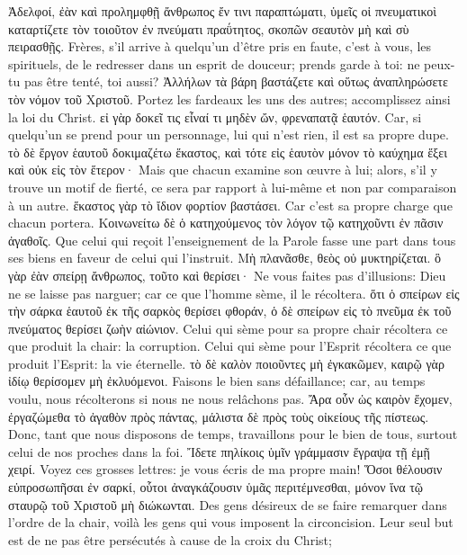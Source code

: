 \documentclass[14pt,a4paper,twoside]{extarticle}
\begin{document}
\begin{paracol}[1]
  \verset
  {Ἀδελφοί, ἐὰν καὶ προλημφθῇ ἄνθρωπος ἔν τινι παραπτώματι, ὑμεῖς οἱ πνευματικοὶ καταρτίζετε τὸν τοιοῦτον ἐν πνεύματι πραΰτητος, σκοπῶν σεαυτὸν μὴ καὶ σὺ πειρασθῇς.}
  {Frères, s’il arrive à quelqu’un d’être pris en faute, c’est à vous, les spirituels, de le redresser dans un esprit de douceur; prends garde à toi: ne peux-tu pas être tenté, toi aussi?}
  \verset
  {Ἀλλήλων τὰ βάρη βαστάζετε καὶ οὕτως ἀναπληρώσετε τὸν νόμον τοῦ Χριστοῦ.}
  {Portez les fardeaux les uns des autres; accomplissez ainsi la loi du Christ.}
  \verset
  {εἰ γὰρ δοκεῖ τις εἶναί τι μηδὲν ὤν, φρεναπατᾷ ἑαυτόν.}
  {Car, si quelqu’un se prend pour un personnage, lui qui n’est rien, il est sa propre dupe.}
  \verset
  {τὸ δὲ ἔργον ἑαυτοῦ δοκιμαζέτω ἕκαστος, καὶ τότε εἰς ἑαυτὸν μόνον τὸ καύχημα ἕξει καὶ οὐκ εἰς τὸν ἕτερον·}
  {Mais que chacun examine son œuvre à lui; alors, s’il y trouve un motif de fierté, ce sera par rapport à lui-même et non par comparaison à un autre.}
  \verset
  {ἕκαστος γὰρ τὸ ἴδιον φορτίον βαστάσει.}
  {Car c’est sa propre charge que chacun portera.}
  \verset
  {Κοινωνείτω δὲ ὁ κατηχούμενος τὸν λόγον τῷ κατηχοῦντι ἐν πᾶσιν ἀγαθοῖς.}
  {Que celui qui reçoit l’enseignement de la Parole fasse une part dans tous ses biens en faveur de celui qui l’instruit.}
  \verset
  {Μὴ πλανᾶσθε, θεὸς οὐ μυκτηρίζεται. ὃ γὰρ ἐὰν σπείρῃ ἄνθρωπος, τοῦτο καὶ θερίσει·}
  {Ne vous faites pas d’illusions: Dieu ne se laisse pas narguer; car ce que l’homme sème, il le récoltera.}
  \verset
  {ὅτι ὁ σπείρων εἰς τὴν σάρκα ἑαυτοῦ ἐκ τῆς σαρκὸς θερίσει φθοράν, ὁ δὲ σπείρων εἰς τὸ πνεῦμα ἐκ τοῦ πνεύματος θερίσει ζωὴν αἰώνιον.}
  {Celui qui sème pour sa propre chair récoltera ce que produit la chair: la corruption. Celui qui sème pour l’Esprit récoltera ce que produit l’Esprit: la vie éternelle.}
  \verset
  {τὸ δὲ καλὸν ποιοῦντες μὴ ἐγκακῶμεν, καιρῷ γὰρ ἰδίῳ θερίσομεν μὴ ἐκλυόμενοι.}
  {Faisons le bien sans défaillance; car, au temps voulu, nous récolterons si nous ne nous relâchons pas.}
  \verset
  {Ἄρα οὖν ὡς καιρὸν ἔχομεν, ἐργαζώμεθα τὸ ἀγαθὸν πρὸς πάντας, μάλιστα δὲ πρὸς τοὺς οἰκείους τῆς πίστεως.}
  {Donc, tant que nous disposons de temps, travaillons pour le bien de tous, surtout celui de nos proches dans la foi.}
  \verset
  {Ἴδετε πηλίκοις ὑμῖν γράμμασιν ἔγραψα τῇ ἐμῇ χειρί.}
  {Voyez ces grosses lettres: je vous écris de ma propre main!}
  \verset
  {Ὅσοι θέλουσιν εὐπροσωπῆσαι ἐν σαρκί, οὗτοι ἀναγκάζουσιν ὑμᾶς περιτέμνεσθαι, μόνον ἵνα τῷ σταυρῷ τοῦ Χριστοῦ μὴ διώκωνται.}
  {Des gens désireux de se faire remarquer dans l’ordre de la chair, voilà les gens qui vous imposent la circoncision. Leur seul but est de ne pas être persécutés à cause de la croix du Christ;}

\end{paracol}
\end{document}
